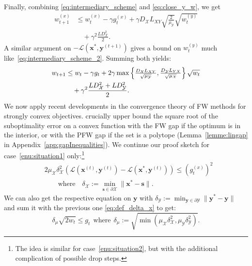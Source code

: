 \documentclass[twoside]{article}
\renewcommand{\L}{\mathcal{L}}
\newcommand{\X}{\mathcal{X}}
\newcommand{\Y}{\mathcal{Y}}
\newcommand{\x}{\bm{x}}
\newcommand{\y}{\bm{y}}
\newcommand{\s}{\bm{s}}
\newcommand{\xt}{\bm{x}^{(t)}}
\newcommand{\yt}{\bm{y}^{(t)}}
\newcommand{\ytt}{\bm{y}^{(t+1)}}
\newcommand{\gap}{g_{t}}
\newcommand{\stepsize}{\gamma}
\newcommand{\0}{\mathbf{0}} %
\begin{document}
Finally, combining \eqref{eq:intermediary_scheme} and \eqref{eq:close_y_w}, we get
\begin{equation}
 \begin{aligned}\label{eq:intermediary_scheme_2}
   w_{t+1}^{(x)} & \leq w_t^{(x)} 
                  - \stepsize g_t^{(x)} 
                  + \stepsize D_\X L_{XY}\sqrt{\frac{2}{\mu_\Y}} \sqrt{w_t^{(y)}} \\
                  & \quad + \stepsize^2 \frac{L D_\X^2}{2}.
 \end{aligned}
\end{equation}
A similar argument on $-\L(\x^*, \ytt)$ gives a bound on $w_t^{(y)}$ much like~\eqref{eq:intermediary_scheme_2}. Summing both yields:
\begin{align}
    w_{t+1} &\leq w_t - \stepsize g_t + 2\stepsize \max\left\{\tfrac{D_\X L_{XY}}{\sqrt{\mu_\Y}},\tfrac{D_\Y L_{YX}}{\sqrt{\mu_\X}}\right\} \sqrt{w_t}  \notag \\
            & \quad + \stepsize^2 \frac{L D_\X^2+ L D_\Y^2}{2}.
\end{align}
We now apply recent developments in the convergence theory of FW methods for strongly convex objectives. \citet{lacoste2015global} crucially upper bound the square root of the suboptimality error on a convex function with the FW gap if the optimum is in the interior, or with the PFW gap if the set is a polytope (Lemma~\ref{lemme:lingap} in Appendix~\ref{app:gapInequalities}). We continue our proof sketch for case~\eqref{enu:situation1} only:\footnote{The idea is similar for case~\eqref{enu:situation2}, but with the additional complication of possible drop steps.}
\begin{equation}
\begin{aligned}
 \label{eq:def_delta_x}
  & {2 \mu_\X \delta_\X^2}\left(\L(\xt,\yt)-\L(\x^*,\yt)\right) \leq \left(\gap^{(x)}\right)^2  \\
  &\qquad \text{where} \quad \delta_\X :=  \min_{\s \in \partial  \X} \|\x^* -\s\|.
 \end{aligned}
\end{equation}
  We can also get the respective equation on $\y$ with $\delta_\Y :=  \min_{\y \in \partial  \Y} \|\y^* -\y\|$ and sum it with the previous one \eqref{eq:def_delta_x} to get:
  \vspace{-1mm}
\begin{equation}\label{eq:def_delta}
     \delta_\mu \sqrt{2w_t} \leq \gap
     \;\, \text{where} \;\,
      \delta_\mu := \sqrt{\min(\mu_\X\delta_\X^2,\mu_\Y\delta_\Y^2)}.
\end{equation}
\end{document}
